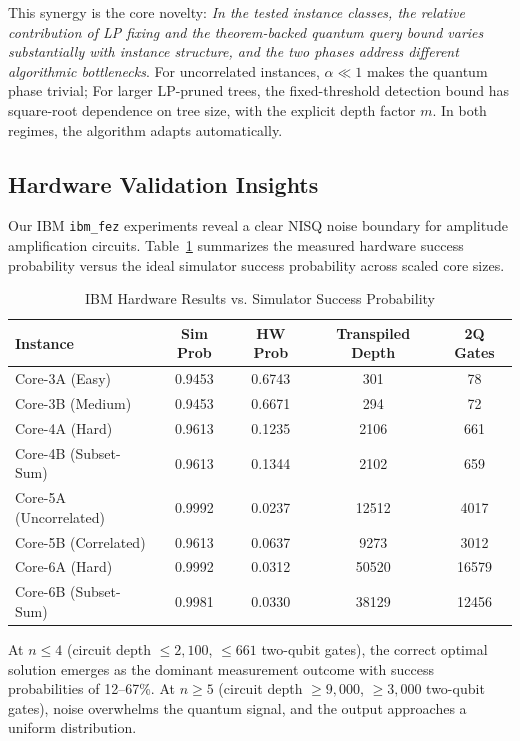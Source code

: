 \documentclass[conference]{IEEEtran}
\begin{document}
This synergy is the core novelty: \textit{In the tested instance classes, the relative contribution of LP fixing and the theorem-backed quantum query bound varies substantially with instance structure, and the two phases address different algorithmic bottlenecks}. For uncorrelated instances, $\alpha \ll 1$ makes the quantum phase trivial; For larger LP-pruned trees, the fixed-threshold detection bound has square-root dependence on tree size, with the explicit depth factor $m$. In both regimes, the algorithm adapts automatically.

\subsection{Hardware Validation Insights}

Our IBM \texttt{ibm\_fez} experiments reveal a clear NISQ noise boundary for amplitude amplification circuits. Table~\ref{tab:hardware} summarizes the measured hardware success probability versus the ideal simulator success probability across scaled core sizes.

\begin{table}[t]
\caption{IBM Hardware Results vs. Simulator Success Probability}
\label{tab:hardware}
\centering
\begin{tabular}{lcccc}
\toprule
\textbf{Instance} & \textbf{Sim Prob} & \textbf{HW Prob} & \textbf{Transpiled Depth} & \textbf{2Q Gates} \\
\midrule
Core-3A (Easy) & 0.9453 & 0.6743 & 301 & 78 \\
Core-3B (Medium) & 0.9453 & 0.6671 & 294 & 72 \\
Core-4A (Hard) & 0.9613 & 0.1235 & 2106 & 661 \\
Core-4B (Subset-Sum) & 0.9613 & 0.1344 & 2102 & 659 \\
Core-5A (Uncorrelated) & 0.9992 & 0.0237 & 12512 & 4017 \\
Core-5B (Correlated) & 0.9613 & 0.0637 & 9273 & 3012 \\
Core-6A (Hard) & 0.9992 & 0.0312 & 50520 & 16579 \\
Core-6B (Subset-Sum) & 0.9981 & 0.0330 & 38129 & 12456 \\
\bottomrule
\end{tabular}
\end{table}

At $n \leq 4$ (circuit depth $\leq 2{,}100$, $\leq 661$ two-qubit gates), the correct optimal solution emerges as the dominant measurement outcome with success probabilities of 12--67\%. At $n \geq 5$ (circuit depth $\geq 9{,}000$, $\geq 3{,}000$ two-qubit gates), noise overwhelms the quantum signal, and the output approaches a uniform distribution.
\end{document}
